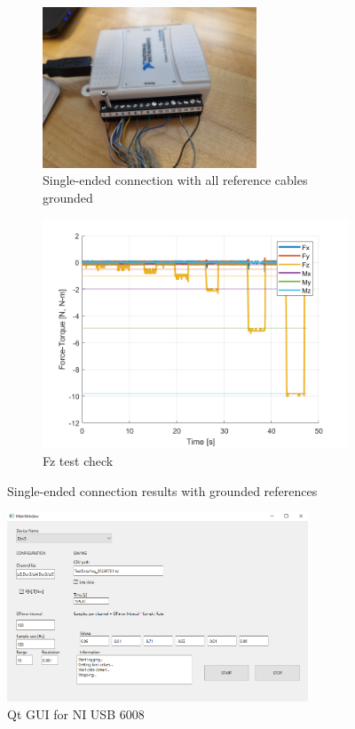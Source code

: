 \documentclass[a4paper]{article}
\begin{document}
\begin{figure}[h!]
	\begin{subfigure}{.5\textwidth}
		\centering
		\includegraphics[width=0.7\textwidth,angle=180]{NIUSB6008_ATIMini40Connection_grounded.jpg}
		\caption{Single-ended connection with all reference cables grounded}
		\label{fig:NIUSB6008_ATIMini40Connection}
	\end{subfigure}%
	\begin{subfigure}{.5\textwidth}
		\centering
		\includegraphics[width=.8\linewidth]{Forces_check50Hz_grounded.png}
		\caption{Fz test check}
		\label{fig:Forces_check50Hz_grounded}
	\end{subfigure}
	\caption{Single-ended connection results with grounded references}
	\label{fig:test2}
\end{figure}

\begin{figure}[h!]
	\centering
	\includegraphics[width=0.8\textwidth]{NIUSB6008_GUI.png}
	\caption{Qt GUI for NI USB 6008}
	\label{fig:NIUSB6008_GUI}
\end{figure}
\end{document}
